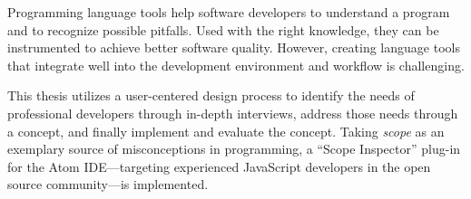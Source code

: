 Programming language tools help software developers to understand a
program and to recognize possible pitfalls. Used with the right
knowledge, they can be instrumented to achieve better software quality.
However, creating language tools that integrate well into the
development environment and workflow is challenging.

This thesis utilizes a user-centered design process to identify the
needs of professional developers through in-depth interviews, address
those needs through a concept, and finally implement and evaluate the
concept. Taking \emph{scope} as an exemplary source of misconceptions in
programming, a “Scope Inspector” plug-in for the Atom IDE—targeting
experienced JavaScript developers in the open source community—is
implemented.
